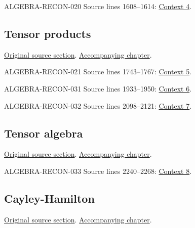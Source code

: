 \begin{AlgebraSourceRoutes}
\item[ALGEBRA-RECON-020] Source lines 1608--1614: \hyperlink{algebra-context-004}{Context 4}.
\end{AlgebraSourceRoutes}

\subsection{Tensor products}
\hypertarget{algebra-source-section-tensor-product}{}
\noindent\href{https://github.com/stacks/stacks-project/blob/a04446e57ec1fbc252a871afcec7752fb2807b14/algebra.tex\#L1702}{Original source section}. \href{algebra.pdf\#nameddest=section-tensor-product}{Accompanying chapter}.

\begin{AlgebraSourceRoutes}
\item[ALGEBRA-RECON-021] Source lines 1743--1767: \hyperlink{algebra-context-005}{Context 5}.
\item[ALGEBRA-RECON-031] Source lines 1933--1950: \hyperlink{algebra-context-006}{Context 6}.
\item[ALGEBRA-RECON-032] Source lines 2098--2121: \hyperlink{algebra-context-007}{Context 7}.
\end{AlgebraSourceRoutes}

\subsection{Tensor algebra}
\hypertarget{algebra-source-section-tensor-algebra}{}
\noindent\href{https://github.com/stacks/stacks-project/blob/a04446e57ec1fbc252a871afcec7752fb2807b14/algebra.tex\#L2164}{Original source section}. \href{algebra.pdf\#nameddest=section-tensor-algebra}{Accompanying chapter}.

\begin{AlgebraSourceRoutes}
\item[ALGEBRA-RECON-033] Source lines 2240--2268: \hyperlink{algebra-context-008}{Context 8}.
\end{AlgebraSourceRoutes}

\subsection{Cayley-Hamilton}
\hypertarget{algebra-source-section-cayley-hamilton}{}
\noindent\href{https://github.com/stacks/stacks-project/blob/a04446e57ec1fbc252a871afcec7752fb2807b14/algebra.tex\#L2806}{Original source section}. \href{algebra.pdf\#nameddest=section-cayley-hamilton}{Accompanying chapter}.

